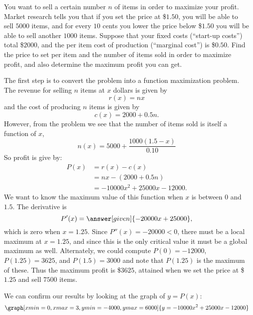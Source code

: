 \documentclass{ximera}
\begin{document}
\begin{example}
  You want to sell a certain number $n$ of items in order to maximize
  your profit.  Market research tells you that if you set the price at
  \$$1.50$, you will be able to sell $5000$ items, and for every $10$
  cents you lower the price below \$$1.50$ you will be able to sell
  another $1000$ items.  Suppose that your fixed costs (``start-up
  costs'') total \$$2000$, and the per item cost of production
  (``marginal cost'') is \$$0.50$.  Find the price to set per item and
  the number of items sold in order to maximize profit, and also
  determine the maximum profit you can get.
\begin{explanation}
The first step is to convert the problem into a function maximization
problem. The revenue for selling $n$ items at $x$ dollars is given by
\[
r(x) = nx
\]
and the cost of producing $n$ items is given by
\[
c(x) = 2000+0.5 n. 
\]
However, from the problem we see that the number of items sold is
itself a function of $x$,
\[
n(x) =5000+\frac{1000(1.5-x)}{0.10}
\]
So profit is give by:
\begin{align*}
P(x) &= r(x) - c(x)\\
&= nx - (2000+0.5 n)\\
&=-10000x^2+25000x-12000. 
\end{align*}
We want to know the maximum value of this function when $x$ is between
0 and $1.5$. The derivative is
\[
P'(x)=\answer[given]{-20000x+25000},
\]
which is zero when $x=1.25$. Since $P''(x)=-20000<0$, there must be a
local maximum at $x=1.25$, and since this is the only critical value
it must be a global maximum as well. Alternately, we could compute
$P(0)=-12000$, $P(1.25)=3625$, and $P(1.5)=3000$ and note that
$P(1.25)$ is the maximum of these. Thus the maximum profit is
\$$3625$, attained when we set the price at \$$1.25$ and sell $7500$
items.
\begin{onlineOnly} 
   We can confirm our results by looking at the graph of $y=P(x)$:
   \[
   \graph[xmin=0,xmax=3,ymin=-4000,ymax=6000]{y=-10000x^2+25000x-12000}
   \]
\end{onlineOnly}
\end{explanation}
\end{example}
\end{document}
